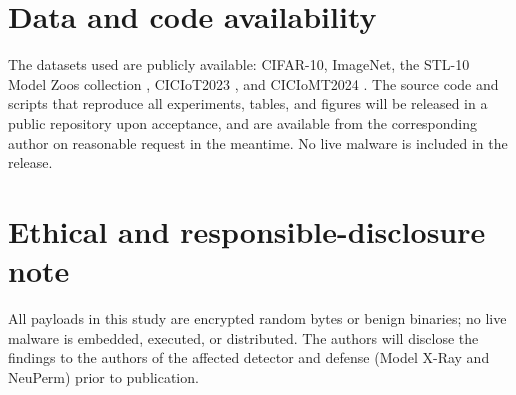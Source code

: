 \documentclass[a4paper,fleqn]{cas-dc}
\theoremstyle{plain}
\theoremstyle{remark}
\begin{document}
\section*{Data and code availability}
The datasets used are publicly available: CIFAR-10, ImageNet, the STL-10 Model Zoos
collection \citep{schurholt2022modelzoos}, CICIoT2023 \citep{neto2023ciciot2023}, and
CICIoMT2024 \citep{dadkhah2024ciciomt2024}. The source code and scripts that reproduce
all experiments, tables, and figures will be released in a public repository upon
acceptance, and are available from the corresponding author on reasonable request in
the meantime. No live malware is included in the release.

\section*{Ethical and responsible-disclosure note}
All payloads in this study are encrypted random bytes or benign binaries; no live
malware is embedded, executed, or distributed. The authors will disclose the findings to
the authors of the affected detector and defense (Model X-Ray and NeuPerm) prior to
publication.



\end{document}
